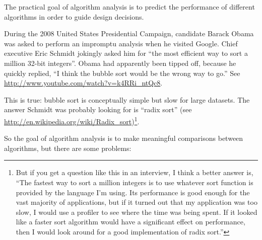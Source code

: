 \documentclass[12pt]{book}
\theoremstyle{exercise}
\begin{document}

The practical goal of algorithm analysis is to predict the performance
of different algorithms in order to guide design decisions.

During the 2008 United States Presidential Campaign, candidate
Barack Obama was asked to perform an impromptu analysis when
he visited Google.  Chief executive Eric Schmidt jokingly asked him
for ``the most efficient way to sort a million 32-bit integers''.
Obama had apparently been tipped off, because he quickly
replied, ``I think the bubble sort would be the wrong way to go.''
See \url{http://www.youtube.com/watch?v=k4RRi_ntQc8}.

This is true: bubble sort is conceptually simple but slow for
large datasets.  The answer Schmidt was probably looking for is
``radix sort'' (see \url{http://en.wikipedia.org/wiki/Radix_sort})\footnote{
But if you get a question like this in an interview, I think
a better answer is, ``The fastest way to sort a million integers
is to use whatever sort function is provided by the language
I'm using.  Its performance is good enough for the vast majority
of applications, but if it turned out that my application was too
slow, I would use a profiler to see where the time was being
spent.  If it looked like a faster sort algorithm would have
a significant effect on performance, then I would look
around for a good implementation of radix sort.''}.

So the goal of algorithm analysis is to make meaningful
comparisons between algorithms, but there are some problems:
\end{document}
